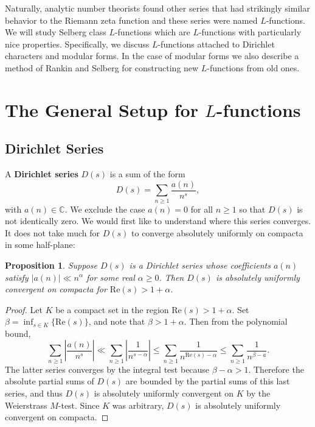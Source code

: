 \documentclass[12pt]{book}
\newtheorem{proposition}{Proposition}[section]
\theoremstyle{definition}\newframedtheorem{method}{Method}
\newcommand{\C}{\mathbb{C}}
\renewcommand{\a}{\alpha}
\renewcommand{\b}{\beta}
\newcommand{\<}{\langle}
\renewcommand{\>}{\rangle}
\renewcommand{\Re}{\mathrm{Re}}
\begin{document}
  Naturally, analytic number theorists found other series that had strikingly similar behavior to the Riemann zeta function and these series were named $L$-functions. We will study Selberg class $L$-functions which are $L$-functions with particularly nice properties. Specifically, we discuss $L$-functions attached to Dirichlet characters and modular forms. In the case of modular forms we also describe a method of Rankin and Selberg for constructing new $L$-functions from old ones.
  \section{The General Setup for \texorpdfstring{$L$}{L}-functions}\label{sec:The_General_Setup_for_L-functions}
    \subsection*{Dirichlet Series}
      A \textbf{Dirichlet series} $D(s)$ is a sum of the form
      \[
        D(s) = \sum_{n \ge 1}\frac{a(n)}{n^{s}},
      \]
      with $a(n) \in \C$. We exclude the case $a(n) = 0$ for all $n \ge 1$ so that $D(s)$ is not identically zero. We would first like to understand where this series converges. It does not take much for $D(s)$ to converge absolutely uniformly on compacta in some half-plane:

      \begin{proposition}\label{prop:Dirichlet_series_holomorphic}
        Suppose $D(s)$ is a Dirichlet series whose coefficients $a(n)$ satisfy $|a(n)| \ll n^{\a}$ for some real $\a \ge 0$. Then $D(s)$ is absolutely uniformly convergent on compacta for $\Re(s) > 1+\a$.
      \end{proposition}
      \begin{proof}
        Let $K$ be a compact set in the region $\Re(s) > 1+\a$. Set $\b = \inf_{s \in K}\{\Re(s)\}$, and note that $\b > 1+\a$. Then from the polynomial bound,
        \[
          \sum_{n \ge 1}\left|\frac{a(n)}{n^{s}}\right| \ll \sum_{n \ge 1}\left|\frac{1}{n^{s-\a}}\right| \le \sum_{n \ge 1}\frac{1}{n^{\Re(s)-\a}} \le \sum_{n \ge 1}\frac{1}{n^{\b-a}}.
        \]
        The latter series converges by the integral test because $\b-\a > 1$. Therefore the absolute partial sums of $D(s)$ are bounded by the partial sums of this last series, and thus $D(s)$ is absolutely uniformly convergent on $K$ by the Weierstrass $M$-test. Since $K$ was arbitrary, $D(s)$ is absolutely uniformly convergent on compacta.
      \end{proof}
\end{document}
